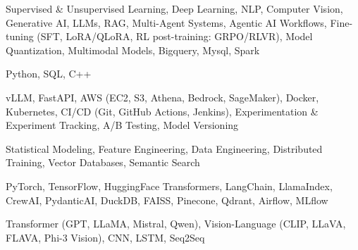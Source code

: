 \documentclass[letter,10pt]{article}
\begin{document}
 Supervised \& Unsupervised Learning, Deep Learning, NLP, Computer Vision, Generative AI, LLMs, RAG, Multi-Agent Systems, Agentic AI Workflows, Fine-tuning (SFT, LoRA/QLoRA, RL post-training: GRPO/RLVR), Model Quantization, Multimodal Models, Bigquery, Mysql, Spark\par\vspace{2pt}

 Python, SQL, C++\par\vspace{2pt}

 vLLM, FastAPI, AWS (EC2, S3, Athena, Bedrock, SageMaker), Docker, Kubernetes, CI/CD (Git, GitHub Actions, Jenkins), Experimentation \& Experiment Tracking, A/B Testing, Model Versioning\par\vspace{2pt}

 Statistical Modeling, Feature Engineering, Data Engineering, Distributed Training, Vector Databases, Semantic Search\par\vspace{2pt}

 PyTorch, TensorFlow, HuggingFace Transformers, LangChain, LlamaIndex, CrewAI, PydanticAI, DuckDB, FAISS, Pinecone, Qdrant, Airflow, MLflow\par\vspace{2pt}

 Transformer (GPT, LLaMA, Mistral, Qwen), Vision-Language (CLIP, LLaVA, FLAVA, Phi-3 Vision), CNN, LSTM, Seq2Seq
\end{document}
